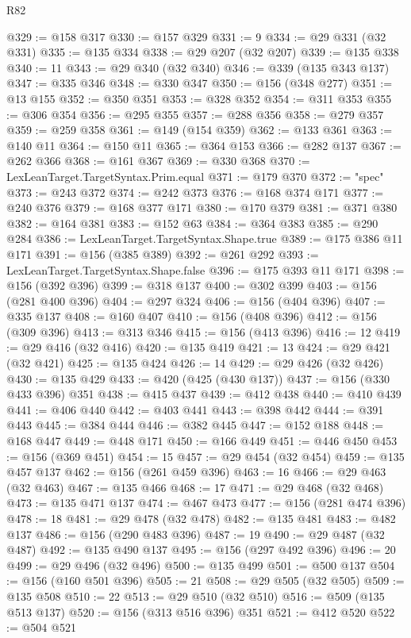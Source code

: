 \begin{lexlean}{R82}
\begin{coremodule}
@329 := @158 @317
@330 := @157 @329
@331 := 9
@334 := @29 @331 (@32 @331)
@335 := @135 @334
@338 := @29 @207 (@32 @207)
@339 := @135 @338
@340 := 11
@343 := @29 @340 (@32 @340)
@346 := @339 (@135 @343 @137)
@347 := @335 @346
@348 := @330 @347
@350 := @156 (@348 @277)
@351 := @13 @155
@352 := @350 @351
@353 := @328 @352
@354 := @311 @353
@355 := @306 @354
@356 := @295 @355
@357 := @288 @356
@358 := @279 @357
@359 := @259 @358
@361 := @149 (@154 @359)
@362 := @133 @361
@363 := @140 @11
@364 := @150 @11
@365 := @364 @153
@366 := @282 @137
@367 := @262 @366
@368 := @161 @367
@369 := @330 @368
@370 := LexLeanTarget.TargetSyntax.Prim.equal
@371 := @179 @370
@372 := "spec"
@373 := @243 @372
@374 := @242 @373
@376 := @168 @374 @171
@377 := @240 @376
@379 := @168 @377 @171
@380 := @170 @379
@381 := @371 @380
@382 := @164 @381
@383 := @152 @63
@384 := @364 @383
@385 := @290 @284
@386 := LexLeanTarget.TargetSyntax.Shape.true
@389 := @175 @386 @11 @171
@391 := @156 (@385 @389)
@392 := @261 @292
@393 := LexLeanTarget.TargetSyntax.Shape.false
@396 := @175 @393 @11 @171
@398 := @156 (@392 @396)
@399 := @318 @137
@400 := @302 @399
@403 := @156 (@281 @400 @396)
@404 := @297 @324
@406 := @156 (@404 @396)
@407 := @335 @137
@408 := @160 @407
@410 := @156 (@408 @396)
@412 := @156 (@309 @396)
@413 := @313 @346
@415 := @156 (@413 @396)
@416 := 12
@419 := @29 @416 (@32 @416)
@420 := @135 @419
@421 := 13
@424 := @29 @421 (@32 @421)
@425 := @135 @424
@426 := 14
@429 := @29 @426 (@32 @426)
@430 := @135 @429
@433 := @420 (@425 (@430 @137))
@437 := @156 (@330 @433 @396) @351
@438 := @415 @437
@439 := @412 @438
@440 := @410 @439
@441 := @406 @440
@442 := @403 @441
@443 := @398 @442
@444 := @391 @443
@445 := @384 @444
@446 := @382 @445
@447 := @152 @188
@448 := @168 @447
@449 := @448 @171
@450 := @166 @449
@451 := @446 @450
@453 := @156 (@369 @451)
@454 := 15
@457 := @29 @454 (@32 @454)
@459 := @135 @457 @137
@462 := @156 (@261 @459 @396)
@463 := 16
@466 := @29 @463 (@32 @463)
@467 := @135 @466
@468 := 17
@471 := @29 @468 (@32 @468)
@473 := @135 @471 @137
@474 := @467 @473
@477 := @156 (@281 @474 @396)
@478 := 18
@481 := @29 @478 (@32 @478)
@482 := @135 @481
@483 := @482 @137
@486 := @156 (@290 @483 @396)
@487 := 19
@490 := @29 @487 (@32 @487)
@492 := @135 @490 @137
@495 := @156 (@297 @492 @396)
@496 := 20
@499 := @29 @496 (@32 @496)
@500 := @135 @499
@501 := @500 @137
@504 := @156 (@160 @501 @396)
@505 := 21
@508 := @29 @505 (@32 @505)
@509 := @135 @508
@510 := 22
@513 := @29 @510 (@32 @510)
@516 := @509 (@135 @513 @137)
@520 := @156 (@313 @516 @396) @351
@521 := @412 @520
@522 := @504 @521

\end{coremodule}
\end{lexlean}

